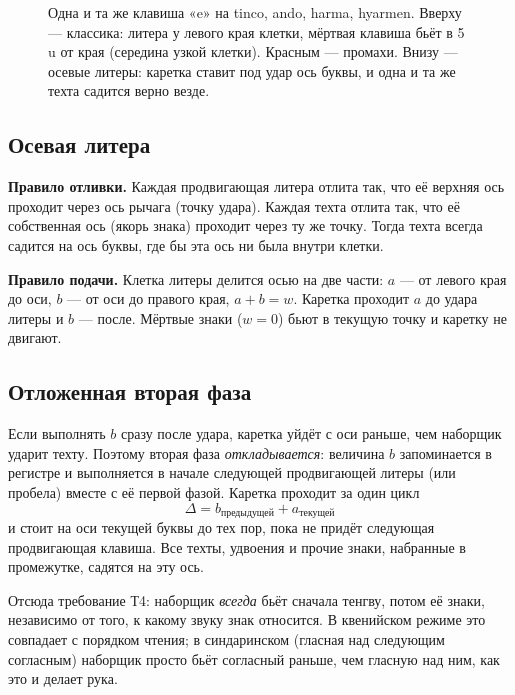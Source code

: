 \documentclass[11pt,a4paper]{article}
\newlength\tgem \setlength\tgem{5mm}
\newcommand\tgu{0.001\tgem}
\begin{document}
\begin{figure}[h]
\centering
\setlength\tgem{19mm}
\begin{tikzpicture}[x=\tgu,y=\tgu]

\end{tikzpicture}
\caption{Одна и та же клавиша «e» на tinco, ando, harma, hyarmen. Вверху — классика: литера у левого края клетки, мёртвая клавиша бьёт в 5\,u от края (середина узкой клетки). Красным — промахи. Внизу — осевые литеры: каретка ставит под удар ось буквы, и одна и та же техта садится верно везде.}
\label{fig:principle}
\end{figure}

\subsection{Осевая литера}

\textbf{Правило отливки.} Каждая продвигающая литера отлита так, что её верхняя ось проходит через ось рычага (точку удара). Каждая техта отлита так, что её собственная ось (якорь знака) проходит через ту же точку. Тогда техта всегда садится на ось буквы, где бы эта ось ни была внутри клетки.

\textbf{Правило подачи.} Клетка литеры делится осью на две части: $a$ — от левого края до оси, $b$ — от оси до правого края, $a + b = w$. Каретка проходит $a$ до удара литеры и $b$ — после. Мёртвые знаки ($w = 0$) бьют в текущую точку и каретку не двигают.

\subsection{Отложенная вторая фаза}

Если выполнять $b$ сразу после удара, каретка уйдёт с оси раньше, чем наборщик ударит техту. Поэтому вторая фаза \emph{откладывается}: величина $b$ запоминается в регистре и выполняется в начале следующей продвигающей литеры (или пробела) вместе с её первой фазой. Каретка проходит за один цикл
\[
  \Delta = b_{\text{предыдущей}} + a_{\text{текущей}}
\]
и стоит на оси текущей буквы до тех пор, пока не придёт следующая продвигающая клавиша. Все техты, удвоения и прочие знаки, набранные в промежутке, садятся на эту ось.

Отсюда требование Т4: наборщик \emph{всегда} бьёт сначала тенгву, потом её знаки, независимо от того, к какому звуку знак относится. В квенийском режиме это совпадает с порядком чтения; в синдаринском (гласная над следующим согласным) наборщик просто бьёт согласный раньше, чем гласную над ним, как это и делает рука.
\end{document}
